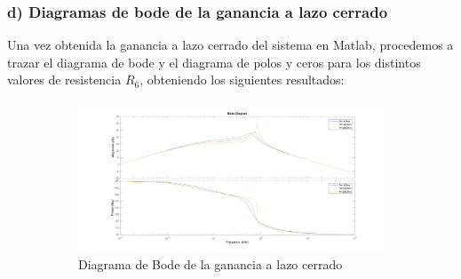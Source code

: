 \documentclass[e4_tp2_main.tex]{subfiles}
\begin{document}
\subsubsection*{d) Diagramas de bode de la ganancia a lazo cerrado }

Una vez obtenida la ganancia a lazo cerrado del sistema en Matlab, procedemos a trazar el diagrama de bode y el diagrama de polos y ceros para los distintos valores de resistencia $R_6$, obteniendo los siguientes resultados:  
  
  
\begin{figure}[H]
  \begin{subfigure}[b]{0.4\textwidth}
    \includegraphics[width=\textwidth, height=\textwidth]{Imagenes/Punto1/bode.png}
    \caption{ Diagrama de Bode de la ganancia a lazo cerrado}
    \label{fig:f12}
  \end{subfigure}
  \hfill
  \begin{subfigure}[b]{0.5\textwidth}

\end{subfigure}
\end{figure}
\end{document}

